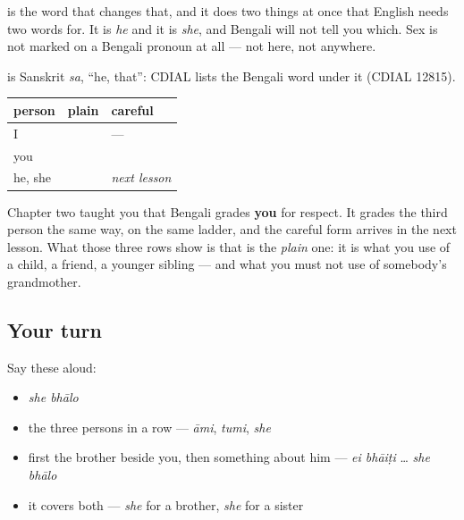 \textbf{} is the word that changes that, and it does two things at once that English needs two words for. It is \emph{he} and it is \emph{she}, and Bengali will not tell you which. Sex is not marked on a Bengali pronoun at all — not here, not anywhere.

\begin{cousinweb}
\textbf{} is Sanskrit \emph{sa}, \textquotedblleft{}he, that\textquotedblright{}: CDIAL lists the Bengali word under it (CDIAL 12815).
\end{cousinweb}

\begin{grammarlens}[title={Grammar Lens: the third row of a table you already half know}]
\noindent
\begin{tabularx}{\linewidth}{@{}>{\raggedright\arraybackslash}X>{\raggedright\arraybackslash}X>{\raggedright\arraybackslash}X@{}}
\toprule
\textbf{person} & \textbf{plain} & \textbf{careful} \\
\midrule
I & \textbf{\bn{আমি}} & — \\
you & \textbf{\bn{তুমি}} & \textbf{\bn{আপনি}} \\
he, she & \textbf{\bn{সে}} & \emph{next lesson} \\
\bottomrule
\end{tabularx}

Chapter two taught you that Bengali grades \textbf{you} for respect. It grades the third person the same way, on the same ladder, and the careful form arrives in the next lesson. What those three rows show is that \textbf{} is the \emph{plain} one: it is what you use of a child, a friend, a younger sibling — and what you must not use of somebody's grandmother.
\end{grammarlens}

\subsection*{Your turn}
Say these aloud:

\begin{itemize}
\raggedright
  \item \emph{she bhālo}
  \item the three persons in a row — \emph{āmi}, \emph{tumi}, \emph{she}
  \item first the brother beside you, then something about him — \emph{ei bhāiṭi} … \emph{she bhālo}
  \item it covers both — \emph{she} for a brother, \emph{she} for a sister
\end{itemize}

